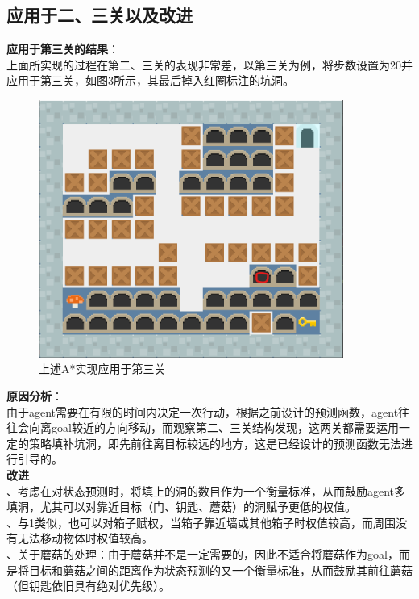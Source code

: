 \documentclass[UTF8]{article}
\begin{document}
\subsection{应用于二、三关以及改进}
\indent\textbf{应用于第三关的结果}：\\
\indent 上面所实现的过程在第二、三关的表现非常差，以第三关为例，将步数设置为20并应用于第三关，如图3所示，其最后掉入红圈标注的坑洞。\\
\begin{figure}[ht]
	\centering\includegraphics[width=10cm]{ai1-3.png}
	\caption{上述A*实现应用于第三关}
\end{figure}

\indent\textbf{原因分析}：\\
\indent 由于agent需要在有限的时间内决定一次行动，根据之前设计的预测函数，agent往往会向离goal较近的方向移动，而观察第二、三关结构发现，这两关都需要运用一定的策略填补坑洞，即先前往离目标较远的地方，这是已经设计的预测函数无法进行引导的。\\

\indent\textbf{改进}\\
、考虑在对状态预测时，将填上的洞的数目作为一个衡量标准，从而鼓励agent多填洞，尤其可以对靠近目标（门、钥匙、蘑菇）的洞赋予更低的权值。\\
、与1类似，也可以对箱子赋权，当箱子靠近墙或其他箱子时权值较高，而周围没有无法移动物体时权值较高。\\
、关于蘑菇的处理：由于蘑菇并不是一定需要的，因此不适合将蘑菇作为goal，而是将目标和蘑菇之间的距离作为状态预测的又一个衡量标准，从而鼓励其前往蘑菇（但钥匙依旧具有绝对优先级）。\\
\end{document}
